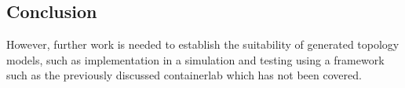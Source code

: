 





\subsection{Conclusion}
 However, further work is needed to establish the suitability of generated topology models, such as implementation in a simulation and testing using a framework such as the previously discussed containerlab \cite{containerlab} which has not been covered. 